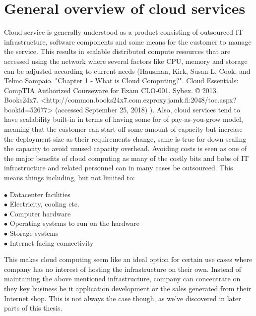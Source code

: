 \documentclass{article}
\begin{document}
\section{General overview of cloud services}
Cloud service is generally understood as a product consisting of outsourced IT infrastructure, software components and some means for the customer to manage the service. This results in scalable distributed compute resources that are accessed using the network where several factors like CPU, memory and storage can be adjusted according to current needs (Hausman, Kirk, Susan L. Cook, and Telmo Sampaio. "Chapter 1 - What is Cloud Computing?". Cloud Essentials: CompTIA Authorized Courseware for Exam CLO-001. Sybex. © 2013. Books24x7. <http://common.books24x7.com.ezproxy.jamk.fi:2048/toc.aspx?bookid=52677> (accessed September 25, 2018) ). Also, cloud services tend to have scalability built-in in terms of having some for of pay-as-you-grow model, meaning that the customer can start off some amount of capacity but increase the deployment size as their requirements change, same is true for down scaling the capacity to avoid unused capacity overhead.
Avoiding costs is seen as one of the major benefits of cloud computing as many of the costly bits and bobs of IT infrastructure and related personnel can in many cases be outsourced. This means things including, but not limited to:
\begin{description}
	\item[$\bullet$ Datacenter facilities]
	\item[$\bullet$ Electricity, cooling etc.]
	\item[$\bullet$ Computer hardware]
	\item[$\bullet$ Operating systems to run on the hardware]
	\item[$\bullet$ Storage systems]
	\item[$\bullet$ Internet facing connectivity]
\end{description}
This makes cloud computing seem like an ideal option for certain use cases where company has no interest of hosting the infrastructure on their own. Instead of maintaining the above mentioned infrastructure, company can concentrate on they key business be it application development or the sales generated from their Internet shop. This is not always the case though, as we've discovered in later parts of this thesis.
\end{document}
